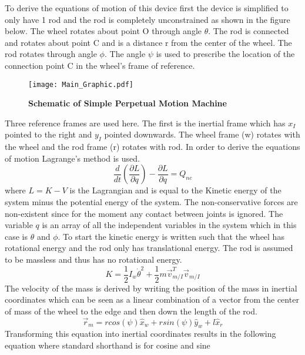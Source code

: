 \documentclass[]{aiaa-tc} %
\begin{document}
To derive the equations of motion of this device first the device is
simplified to only have 1 rod and the rod is completely unconstrained
as shown in the figure below. The wheel rotates about point O through
angle $\theta$. The rod is connected and rotates about point C and is
a distance r from the center of the wheel. The rod rotates through
angle $\phi$. The angle $\psi$ is used to prescribe the location of
the connection point C in the wheel's frame of reference.
\begin{figure}[H]
  \begin{center}
    \texttt{[image: Main\_Graphic.pdf]}
  \end{center}
  \caption{\bf Schematic of Simple Perpetual Motion Machine}
  \label{f:current}
\end{figure}
Three reference frames are used here. The first is the inertial frame
which has $x_I$ pointed to the right and $y_I$ pointed downwards. The
wheel frame (w) rotates with the wheel and the rod frame (r) rotates
with rod. In order to derive the equations of motion Lagrange's method
is used.
\begin{equation}\label{e:lagrangian}
  \frac{d}{dt} \left( \frac{\partial L}{\partial q} \right) - \frac{\partial
    L}{\partial q} = Q_{nc}
\end{equation}
where $L=K-V$ is the Lagrangian and is equal to the Kinetic energy of
the system minus the potential energy of the system. The
non-conservative forces are non-existent since for the moment any
contact between joints is ignored. The variable $q$ is an array of all
the independent variables in the system which in this case is $\theta$
and $\phi$. To start the kinetic energy is written such that the wheel
has rotational energy and the rod only has translational energy. The
rod is assumed to be massless and thus has no rotational energy. 
\begin{equation}
  K = \frac{1}{2}I_w\dot{\theta}^2 +
  \frac{1}{2}m\vec{v}_{m/I}^T\vec{v}_{m/I}
\end{equation}
The velocity of the mass is derived by writing the position of the
mass in inertial coordinates which can be seen as a linear combination
of a vector from the center of mass of the wheel to the edge and then
down the length of the rod. 
\begin{equation}
  \vec{r}_m = r cos(\psi) \hat{x}_w + r sin(\psi) \hat{y}_w + l \hat{x}_r
\end{equation}
Transforming this equation into inertial coordinates results in the
following equation where standard shorthand is for cosine and sine
\end{document}
